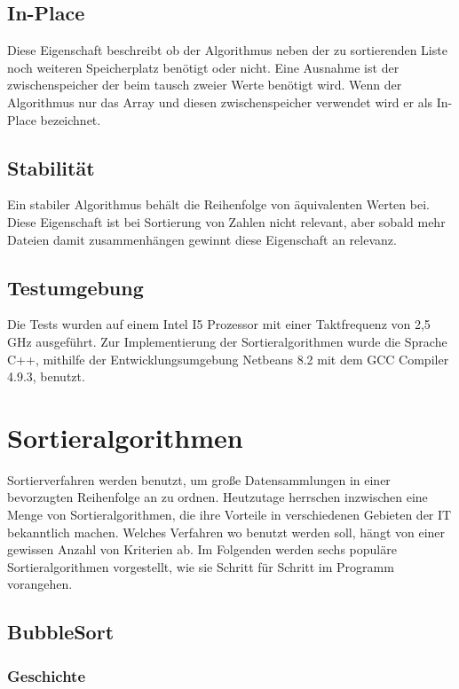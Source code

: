 \documentclass{article}
\begin{document}
\subsection{In-Place}
Diese Eigenschaft beschreibt ob der Algorithmus neben der zu sortierenden Liste noch weiteren Speicherplatz benötigt oder nicht. Eine Ausnahme ist der zwischenspeicher der beim tausch zweier Werte benötigt wird. Wenn der Algorithmus nur das Array und diesen zwischenspeicher verwendet wird er als In-Place bezeichnet. \cite{India2015Dataset}
\subsection{Stabilität}
Ein stabiler Algorithmus behält die Reihenfolge von äquivalenten Werten bei. Diese Eigenschaft ist bei Sortierung von Zahlen nicht relevant, aber sobald mehr Dateien damit zusammenhängen gewinnt diese Eigenschaft an relevanz. \cite{Rehn2006Sortieralgorithmen,India2015Dataset}
\subsection{Testumgebung}
Die Tests wurden auf einem Intel I5 Prozessor mit einer Taktfrequenz von 2,5 GHz ausgeführt. Zur Implementierung der Sortieralgorithmen wurde die Sprache C++, mithilfe der Entwicklungsumgebung Netbeans 8.2 mit dem GCC Compiler 4.9.3, benutzt.

\section{Sortieralgorithmen}
Sortierverfahren werden benutzt, um große Datensammlungen in einer bevorzugten Reihenfolge an zu ordnen. Heutzutage herrschen inzwischen eine Menge von Sortieralgorithmen, die ihre Vorteile in verschiedenen Gebieten der IT bekanntlich machen. Welches Verfahren wo benutzt werden soll, hängt von einer gewissen Anzahl von Kriterien ab.
Im Folgenden werden sechs populäre Sortieralgorithmen vorgestellt, wie sie Schritt für Schritt im Programm vorangehen.

\subsection{BubbleSort}
\subsubsection{Geschichte}
\end{document}
